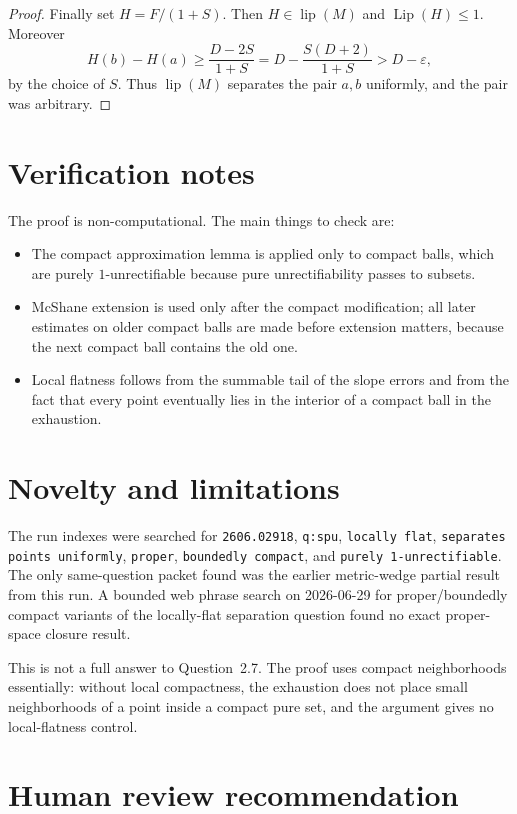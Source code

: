 \documentclass[11pt]{amsart}
\newcommand{\lip}{\operatorname{lip}}
\newcommand{\Lip}{\operatorname{Lip}}
\newcommand{\eps}{\varepsilon}
\begin{document}
\begin{proof}
Finally set $H=F/(1+S)$.  Then $H\in\lip(M)$ and $\Lip(H)\leq1$.  Moreover
\[
  H(b)-H(a)
  \geq \frac{D-2S}{1+S}
  = D-\frac{S(D+2)}{1+S}
  > D-\eps,
\]
by the choice of $S$.  Thus $\lip(M)$ separates the pair $a,b$ uniformly, and
the pair was arbitrary.
\end{proof}

\section*{Verification notes}

The proof is non-computational.  The main things to check are:
\begin{itemize}[leftmargin=*]
\item The compact approximation lemma is applied only to compact balls, which
  are purely $1$-unrectifiable because pure unrectifiability passes to
  subsets.
\item McShane extension is used only after the compact modification; all later
  estimates on older compact balls are made before extension matters, because
  the next compact ball contains the old one.
\item Local flatness follows from the summable tail of the slope errors and
  from the fact that every point eventually lies in the interior of a compact
  ball in the exhaustion.
\end{itemize}

\section*{Novelty and limitations}

The run indexes were searched for \texttt{2606.02918}, \texttt{q:spu},
\texttt{locally flat}, \texttt{separates points uniformly}, \texttt{proper},
\texttt{boundedly compact}, and \texttt{purely 1-unrectifiable}.  The only
same-question packet found was the earlier metric-wedge partial result from
this run.  A bounded web phrase search on 2026-06-29 for proper/boundedly
compact variants of the locally-flat separation question found no exact
proper-space closure result.

This is not a full answer to Question~2.7.  The proof uses compact
neighborhoods essentially: without local compactness, the exhaustion does not
place small neighborhoods of a point inside a compact pure set, and the
argument gives no local-flatness control.

\section*{Human review recommendation}
\end{document}
